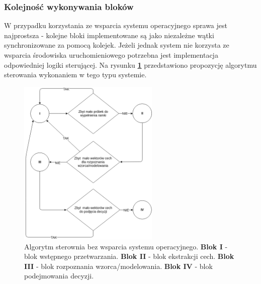 \subsubsection{Kolejność wykonywania bloków}

W przypadku korzystania ze wsparcia systemu operacyjnego sprawa jest najprostsza - kolejne bloki implementowane są jako niezależne wątki synchronizowane za pomocą kolejek. Jeżeli jednak system nie korzysta ze wsparcia środowiska uruchomieniowego potrzebna jest implementacja odpowiedniej logiki sterującej. Na rysunku \textbf{\ref{fig:logics}} przedstawiono propozycję algorytmu sterowania wykonaniem w tego typu systemie.

\begin{figure}[ht!]
  \centering
    \includegraphics[width=0.6\textwidth]{./logic.png}
    \caption{\label{fig:logics} Algorytm sterownia bez wsparcia systemu operacyjnego. \textbf{Blok I} - blok wstępnego przetwarzania. \textbf{Blok II} - blok ekstrakcji cech. \textbf{Blok III} - blok rozpoznania wzorca/modelowania. \textbf{Blok IV} - blok podejmowania decyzji.}
\end{figure}

